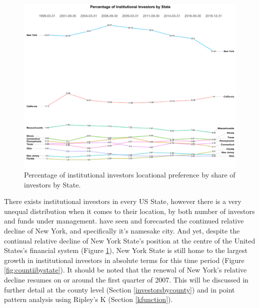 \begin{figure}[h]
	\centering
	\includegraphics[width=\linewidth]{Figures/ChapterIII/Precentage_State}
	\caption[Percentage of Investor by State]{Percentage of institutional investors locational preference by share of investors by State.}
	\label{fig:precentagestate}
\end{figure}
There exists institutional investors in every US State, however there is a very unequal distribution when it comes to their location, by both number of investors and funds under management. \cite{WheelerMitchelson89,Green1995,bodenmanfirm2000, Graves2003} have seen and forecasted the continued relative decline of New York, and specifically it's namesake city.  And yet, despite the continual relative decline of New York State's position at the centre of the United States's financial system (Figure \ref{fig:precentagestate}), New York State is still home to the largest growth in institutional investors in absolute terms for this time period (Figure \ref{fig:countiibystate}). It should be noted that the renewal of New York's relative decline resumes on or around the first quarter of 2007.  This will be discussed in further detail at the county level (Section \ref{investorsbycounty}) and in point pattern analysis using Ripley's K (Section \ref{kfunction}).  	

